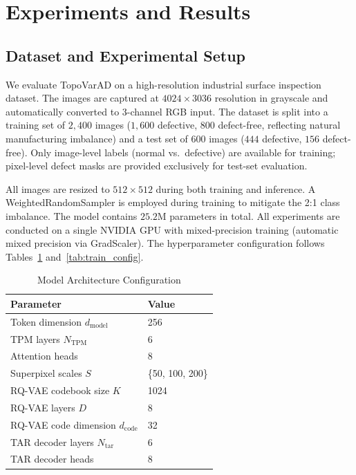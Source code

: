 \documentclass[lettersize,journal]{IEEEtran}
\begin{document}
\section{Experiments and Results}
\label{sec:results}

\subsection{Dataset and Experimental Setup}

We evaluate TopoVarAD on a high-resolution industrial surface inspection dataset. The images are captured at $4024 \times 3036$ resolution in grayscale and automatically converted to 3-channel RGB input. The dataset is split into a training set of $2{,}400$ images ($1{,}600$ defective, $800$ defect-free, reflecting natural manufacturing imbalance) and a test set of $600$ images ($444$ defective, $156$ defect-free). Only image-level labels (normal vs.~defective) are available for training; pixel-level defect masks are provided exclusively for test-set evaluation.

All images are resized to $512 \times 512$ during both training and inference. A WeightedRandomSampler is employed during training to mitigate the 2:1 class imbalance. The model contains $25.2$M parameters in total. All experiments are conducted on a single NVIDIA GPU with mixed-precision training (automatic mixed precision via GradScaler). The hyperparameter configuration follows Tables~\ref{tab:model_config} and~\ref{tab:train_config}.

\begin{table}[!t]
\caption{Model Architecture Configuration\label{tab:model_config}}
\centering
\begin{tabular}{@{}ll@{}}
\toprule
\textbf{Parameter} & \textbf{Value} \\
\midrule
Token dimension $d_{\text{model}}$ & 256 \\
TPM layers $N_{\text{TPM}}$ & 6 \\
Attention heads & 8 \\
Superpixel scales $S$ & \{50, 100, 200\} \\
RQ-VAE codebook size $K$ & 1024 \\
RQ-VAE layers $D$ & 8 \\
RQ-VAE code dimension $d_{\text{code}}$ & 32 \\
TAR decoder layers $N_{\text{tar}}$ & 6 \\
TAR decoder heads & 8 \\
\bottomrule
\end{tabular}
\end{table}
\end{document}
